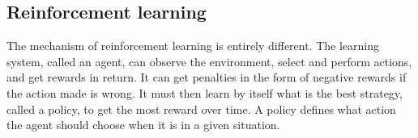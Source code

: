 \subsection{Reinforcement learning}
The mechanism of reinforcement learning is entirely different. The learning system, called an agent, can observe the environment, select and perform actions,
and get rewards in return. It can get penalties in the form of negative rewards if the action made is wrong. It must then learn by itself
what is the best strategy, called a policy, to get the most reward over time. A policy defines what action the agent should choose when it is in a given situation. 